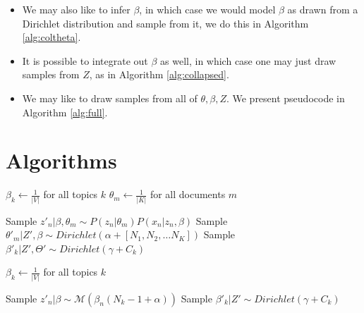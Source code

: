 \documentclass[a0,portrait]{a0poster}
\begin{document}
\begin{multicols}{2}
{\begin{itemize}
		\item We may also like to infer $\beta$, in which case we would model $\beta$ as drawn from a Dirichlet distribution and sample from it, we do this in Algorithm \ref{alg:coltheta}.
		
		\item It is possible to integrate out $\beta$ as well, in which case one may just draw samples from $Z$, as in Algorithm \ref{alg:collapsed}.
		
		\item We may like to draw samples from all of $\theta, \beta, Z$. We present pseudocode in Algorithm \ref{alg:full}.
	\end{itemize}
}

\section{Algorithms}

\begin{minipage}{\linewidth}
	\label{alg:full}
	\begin{algorithmic}[1]
			 
			\State $\beta_k \gets \frac{1}{|V|} $ for all topics $k$
			\State $\theta_m \gets \frac{1}{|K|}$ for all documents $m$
			
						 \State Sample $z'_n | \beta, \theta_m \sim P(z_{n}|\theta_m) P(x_{n}|z_{n}, \beta) $
					\EndFor
					\State Sample $\theta'_m | Z', \beta \sim Dirichlet(\alpha + [N_1, N_2, \dots N_K])$ 
				\EndFor
					\State Sample $\beta'_k | Z', \Theta' \sim Dirichlet(\gamma + C_k)$
				\EndFor
			\EndFor
			\EndFunction
	\end{algorithmic}
\end{minipage}

\begin{minipage}{\linewidth}
	\label{alg:coltheta}
	\begin{algorithmic}[1]
		\State $\beta_k \gets \frac{1}{|V|} $ for all topics $k$
		
		\State Sample $z'_n | \beta \sim \mathcal{M}(\beta_{n} (N_k - 1 + \alpha))$ 
		\EndFor
		\EndFor
		\State Sample $\beta'_k | Z'  \sim Dirichlet(\gamma + C_k)$
		\EndFor
		\EndFor
		\EndFunction
	\end{algorithmic}
\end{minipage}


\end{multicols}
\end{document}
